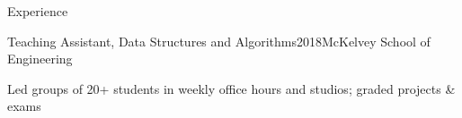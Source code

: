 \begin{rSection}{Experience}
    \begin{rSubsection}{Teaching Assistant, Data Structures and Algorithms}{2018}{McKelvey School of Engineering}{}%
    \item Led groups of 20+ students in weekly office hours and studios; graded projects \& exams
    \end{rSubsection}

  \end{rSection}

\vspace{2mm}
